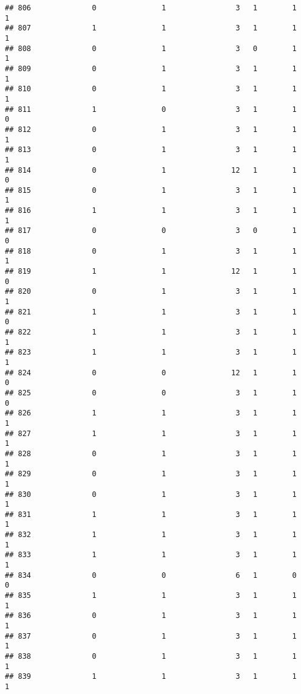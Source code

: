 \documentclass[]{article}
\begin{document}
\begin{verbatim}
## 806              0               1                3   1        1        1
## 807              1               1                3   1        1        1
## 808              0               1                3   0        1        1
## 809              0               1                3   1        1        1
## 810              0               1                3   1        1        1
## 811              1               0                3   1        1        0
## 812              0               1                3   1        1        1
## 813              0               1                3   1        1        1
## 814              0               1               12   1        1        0
## 815              0               1                3   1        1        1
## 816              1               1                3   1        1        1
## 817              0               0                3   0        1        0
## 818              0               1                3   1        1        1
## 819              1               1               12   1        1        0
## 820              0               1                3   1        1        1
## 821              1               1                3   1        1        0
## 822              1               1                3   1        1        1
## 823              1               1                3   1        1        1
## 824              0               0               12   1        1        0
## 825              0               0                3   1        1        0
## 826              1               1                3   1        1        1
## 827              1               1                3   1        1        1
## 828              0               1                3   1        1        1
## 829              0               1                3   1        1        1
## 830              0               1                3   1        1        1
## 831              1               1                3   1        1        1
## 832              1               1                3   1        1        1
## 833              1               1                3   1        1        1
## 834              0               0                6   1        0        0
## 835              1               1                3   1        1        1
## 836              0               1                3   1        1        1
## 837              0               1                3   1        1        1
## 838              0               1                3   1        1        1
## 839              1               1                3   1        1        1

\end{verbatim}
\end{document}
